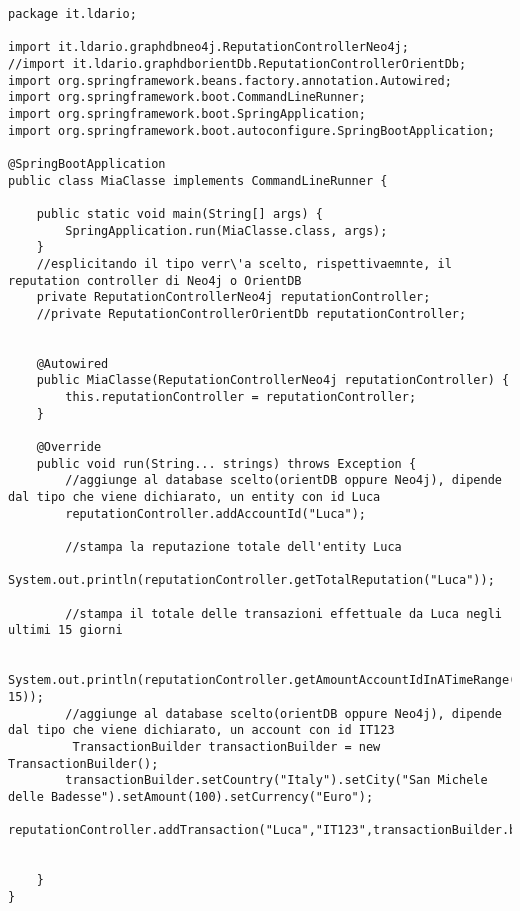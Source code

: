 \begin{lstlisting}
package it.ldario;

import it.ldario.graphdbneo4j.ReputationControllerNeo4j;
//import it.ldario.graphdborientDb.ReputationControllerOrientDb;
import org.springframework.beans.factory.annotation.Autowired;
import org.springframework.boot.CommandLineRunner;
import org.springframework.boot.SpringApplication;
import org.springframework.boot.autoconfigure.SpringBootApplication;

@SpringBootApplication
public class MiaClasse implements CommandLineRunner {

    public static void main(String[] args) {
        SpringApplication.run(MiaClasse.class, args);
    }
	//esplicitando il tipo verr\'a scelto, rispettivaemnte, il reputation controller di Neo4j o OrientDB
    private ReputationControllerNeo4j reputationController;
    //private ReputationControllerOrientDb reputationController;


    @Autowired
    public MiaClasse(ReputationControllerNeo4j reputationController) {
        this.reputationController = reputationController;
    }

    @Override
    public void run(String... strings) throws Exception {
        //aggiunge al database scelto(orientDB oppure Neo4j), dipende dal tipo che viene dichiarato, un entity con id Luca
        reputationController.addAccountId("Luca");

        //stampa la reputazione totale dell'entity Luca
        System.out.println(reputationController.getTotalReputation("Luca"));

        //stampa il totale delle transazioni effettuale da Luca negli ultimi 15 giorni

        System.out.println(reputationController.getAmountAccountIdInATimeRange("Luca", 15));
        //aggiunge al database scelto(orientDB oppure Neo4j), dipende dal tipo che viene dichiarato, un account con id IT123
         TransactionBuilder transactionBuilder = new TransactionBuilder();
        transactionBuilder.setCountry("Italy").setCity("San Michele delle Badesse").setAmount(100).setCurrency("Euro");
        reputationController.addTransaction("Luca","IT123",transactionBuilder.build());
        

    }
}
\end{lstlisting}


